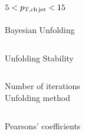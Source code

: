 \documentclass[xcolor={usenames,dvipsnames}, aspectratio=169]{beamer}
\begin{document}
\subsection{$5<p_{\mathrm{T,ch\, jet}}<15$~\GeVc}

\begin{frame}{Bayesian Unfolding}
\begin{columns}
\centering
\centering
\end{columns}
\end{frame}

\begin{frame}{Unfolding Stability}
\begin{columns}
\centering
\tiny 
Number of iterations\\
\centering
\tiny
Unfolding method\\
\end{columns}
\centering
\tiny
Pearsons' coefficients\\
\end{frame}
\end{document}
